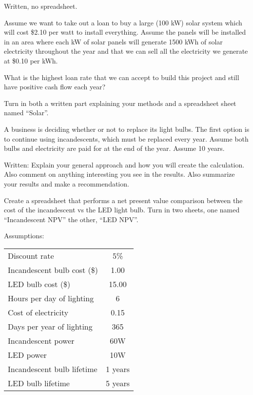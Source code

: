 \documentclass{article}
\begin{document}
Written, no spreadsheet.

Assume we want to take out a loan to buy a large (100 kW) solar system which will
cost \$2.10 per watt to install everything.  Assume the panels will be
installed in an area where each kW of solar panels will generate 1500
kWh of solar electricity throughout the year and that we can sell all
the electricity we generate at \$0.10 per kWh.

What is the highest loan rate that we can accept to build this project
and still have positive cash flow each year?

Turn in both a written part explaining your methods and a spreadsheet
sheet named ``Solar''.




A business is deciding whether or not to replace its light bulbs.  The
first option is to continue using incandescents, which must be replaced
every year.  Assume both bulbs and electricity are paid for at the
end of the year.  Assume 10 years.

Written: Explain your general approach and how you will create the
calculation.  Also comment on anything interesting you see in the
results.  Also summarize your results and make a recommendation.

Create a spreadsheet that performs a net present value comparison
between the cost of the incandescent vs the LED light bulb.  Turn in two
sheets, one named ``Incandescent NPV'' the other, ``LED NPV''.

Assumptions:

\begin{tabular}{l c}
Discount rate               & 5\% \\
Incandescent bulb cost (\$) & 1.00 \\
LED bulb cost (\$)          & 15.00 \\
Hours per day of lighting   & 6 \\
Cost of electricity         & 0.15 \\
Days per year of lighting   & 365 \\
Incandescent power          & 60W \\
LED power                   & 10W \\
Incandescent bulb lifetime  & 1 years \\
LED bulb lifetime           & 5 years \\
\end{tabular}
\end{document}
